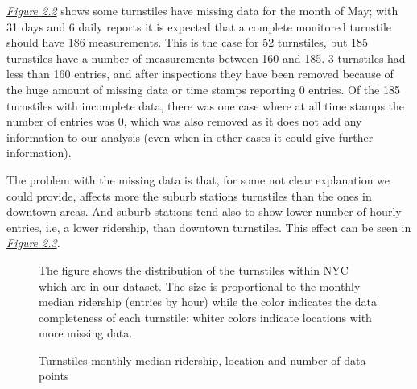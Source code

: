 \documentclass[a4paper,12pt,english]{sphinxmanual}
\begin{document}
{\hyperref[section1:figure22]{\emph{Figure 2.2}}} shows some turnstiles have missing data for the
month of May; with 31 days and 6 daily reports it is expected that a complete
monitored turnstile should have 186 measurements. This is the case for 52
turnstiles, but 185 turnstiles have a number of measurements between 160 and
185. 3 turnstiles had less than 160 entries, and after inspections they have
been removed because of the huge amount of missing data or time stamps
reporting 0 entries. Of the 185 turnstiles with incomplete data, there was one
case where at all time stamps the number of entries was 0, which was also
removed as it does not add any information to our analysis (even when in other
cases it could give further information).

The problem with the missing data is that, for some not clear explanation we
could provide, affects more the suburb stations turnstiles than the ones in
downtown areas. And suburb stations tend also to show lower number of hourly
entries, i.e, a lower ridership, than downtown turnstiles. This effect can be
seen in {\hyperref[section1:figure23]{\emph{Figure 2.3}}}.
\begin{figure}[htbp]
\centering
\capstart

\caption{Turnstiles monthly median ridership, location and number of data points}{\small 
The figure shows the distribution of the turnstiles within NYC which are in
our dataset. The size is proportional to the monthly median ridership
(entries by hour) while the color indicates the data completeness of each
turnstile: whiter colors indicate locations with more missing data.
}\label{section1:figure23}\end{figure}
\end{document}
